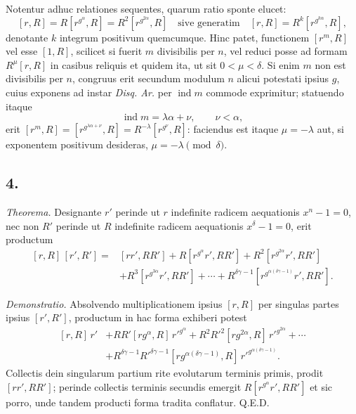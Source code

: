\documentclass[12pt]{article}
\begin{document}
Notentur adhuc relationes sequentes, quarum ratio sponte elucet:
\[
[r,R]=R[r^{g^\alpha},R]=R^2[r^{g^{2\alpha}},R]\quad\text{sive generatim}\quad
[r,R]=R^k[r^{g^{k\alpha}},R],
\]
denotante $k$ integrum positivum quemcumque. Hinc patet, functionem $[r^m,R]$ vel esse $[1,R]$, scilicet si fuerit $m$ divisibilis per $n$, vel reduci posse ad formam $R^\mu[r,R]$ in casibus reliquis et quidem ita, ut sit $0<\mu<\delta$. Si enim $m$ non est divisibilis per $n$, congruus erit secundum modulum $n$ alicui potestati ipsius $g$, cuius exponens ad instar \emph{Disq. Ar.} per $\operatorname{ind} m$ commode exprimitur; statuendo itaque
\[
\operatorname{ind}m=\lambda\alpha+\nu,\qquad \nu<\alpha,
\]
erit $[r^m,R]=[r^{g^{\lambda\alpha+\nu}},R]=R^{-\lambda}[r^{g^\nu},R]$: faciendus est itaque $\mu=-\lambda$ aut, si exponentem positivum desideras, $\mu=-\lambda\pmod\delta$.

\subsection*{4.}

\emph{Theorema.} Designante $r'$ perinde ut $r$ indefinite radicem aequationis $x^n-1=0$, nec non $R'$ perinde ut $R$ indefinite radicem aequationis $x^\delta-1=0$, erit productum
\[
\begin{aligned}
[r,R]\,[r',R']={}&[rr',RR']+R[r^{g^\alpha}r',RR']
+R^2[r^{g^{2\alpha}}r',RR']\\
&+R^3[r^{g^{3\alpha}}r',RR']+\cdots+
R^{\delta\gamma-1}[r^{g^{\alpha(\delta\gamma-1)}}r',RR'].
\end{aligned}
\]

\emph{Demonstratio.} Absolvendo multiplicationem ipsius $[r,R]$ per singulas partes ipsius $[r',R']$, productum in hac forma exhiberi potest
\[
\begin{aligned}
{}[r,R]\,r'&+RR'[rg^\alpha,R]\,r'^{g^\alpha}
+R^2R'^2[rg^{2\alpha},R]\,r'^{g^{2\alpha}}+\cdots\\
&+R^{\delta\gamma-1}R'^{\delta\gamma-1}[rg^{\alpha(\delta\gamma-1)},R]\,
r'^{g^{\alpha(\delta\gamma-1)}}.
\end{aligned}
\]
Collectis dein singularum partium rite evolutarum terminis primis, prodit $[rr',RR']$; perinde collectis terminis secundis emergit $R[r^{g^\alpha}r',RR']$ et sic porro, unde tandem producti forma tradita conflatur. Q.E.D.
\end{document}
